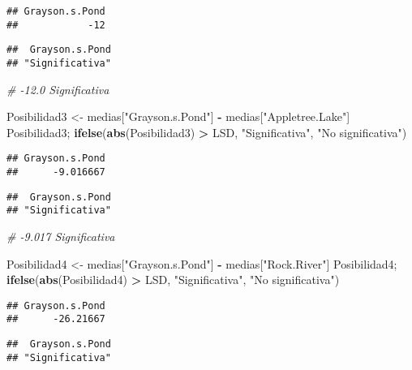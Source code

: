 \documentclass[
]{article}
\newenvironment{Shaded}{\begin{snugshade}}{\end{snugshade}}
\newcommand{\CommentTok}[1]{\textcolor[rgb]{0.56,0.35,0.01}{\textit{#1}}}
\newcommand{\FunctionTok}[1]{\textcolor[rgb]{0.13,0.29,0.53}{\textbf{#1}}}
\newcommand{\NormalTok}[1]{#1}
\newcommand{\OtherTok}[1]{\textcolor[rgb]{0.56,0.35,0.01}{#1}}
\newcommand{\SpecialCharTok}[1]{\textcolor[rgb]{0.81,0.36,0.00}{\textbf{#1}}}
\newcommand{\StringTok}[1]{\textcolor[rgb]{0.31,0.60,0.02}{#1}}
\begin{document}
\begin{verbatim}
## Grayson.s.Pond 
##            -12
\end{verbatim}

\begin{verbatim}
##  Grayson.s.Pond 
## "Significativa"
\end{verbatim}

\begin{Shaded}
\begin{Highlighting}[]
\CommentTok{\# {-}12.0 Significativa}

\NormalTok{Posibilidad3 }\OtherTok{\textless{}{-}}\NormalTok{ medias[}\StringTok{"Grayson.s.Pond"}\NormalTok{] }\SpecialCharTok{{-}}\NormalTok{ medias[}\StringTok{"Appletree.Lake"}\NormalTok{]}
\NormalTok{Posibilidad3; }\FunctionTok{ifelse}\NormalTok{(}\FunctionTok{abs}\NormalTok{(Posibilidad3) }\SpecialCharTok{\textgreater{}}\NormalTok{ LSD, }\StringTok{"Significativa"}\NormalTok{, }\StringTok{"No significativa"}\NormalTok{)}
\end{Highlighting}
\end{Shaded}

\begin{verbatim}
## Grayson.s.Pond 
##      -9.016667
\end{verbatim}

\begin{verbatim}
##  Grayson.s.Pond 
## "Significativa"
\end{verbatim}

\begin{Shaded}
\begin{Highlighting}[]
\CommentTok{\# {-}9.017 Significativa}

\NormalTok{Posibilidad4 }\OtherTok{\textless{}{-}}\NormalTok{ medias[}\StringTok{"Grayson.s.Pond"}\NormalTok{] }\SpecialCharTok{{-}}\NormalTok{ medias[}\StringTok{"Rock.River"}\NormalTok{]}
\NormalTok{Posibilidad4; }\FunctionTok{ifelse}\NormalTok{(}\FunctionTok{abs}\NormalTok{(Posibilidad4) }\SpecialCharTok{\textgreater{}}\NormalTok{ LSD, }\StringTok{"Significativa"}\NormalTok{, }\StringTok{"No significativa"}\NormalTok{)}
\end{Highlighting}
\end{Shaded}

\begin{verbatim}
## Grayson.s.Pond 
##      -26.21667
\end{verbatim}

\begin{verbatim}
##  Grayson.s.Pond 
## "Significativa"
\end{verbatim}
\end{document}
